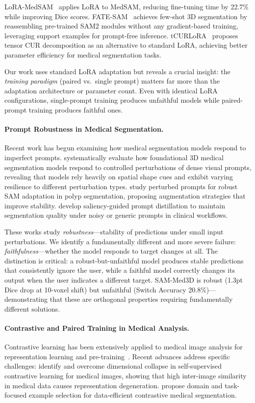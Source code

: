 LoRA-MedSAM~\citep{wu2024loramedsam} applies LoRA to MedSAM, reducing fine-tuning time by 22.7\% while improving Dice scores. FATE-SAM~\citep{deng2025fatesam} achieves few-shot 3D segmentation by reassembling pre-trained SAM2 modules without any gradient-based training, leveraging support examples for prompt-free inference. tCURLoRA~\citep{cheng2025tcurlora} proposes tensor CUR decomposition as an alternative to standard LoRA, achieving better parameter efficiency for medical segmentation tasks.

Our work uses standard LoRA adaptation but reveals a crucial insight: the \emph{training paradigm} (paired vs.\ single prompt) matters far more than the adaptation architecture or parameter count. Even with identical LoRA configurations, single-prompt training produces unfaithful models while paired-prompt training produces faithful ones.

\paragraph{Prompt Robustness in Medical Segmentation.}
Recent work has begun examining how medical segmentation models respond to imperfect prompts. \citet{chattopadhyay2026robustness} systematically evaluate how foundational 3D medical segmentation models respond to controlled perturbations of dense visual prompts, revealing that models rely heavily on spatial shape cues and exhibit varying resilience to different perturbation types. \citet{huang2024perturbed} study perturbed prompts for robust SAM adaptation in polyp segmentation, proposing augmentation strategies that improve stability. \citet{li2024saliency} develop saliency-guided prompt distillation to maintain segmentation quality under noisy or generic prompts in clinical workflows.

These works study \emph{robustness}---stability of predictions under small input perturbations. We identify a fundamentally different and more severe failure: \emph{faithfulness}---whether the model responds to target changes at all. The distinction is critical: a robust-but-unfaithful model produces stable predictions that consistently ignore the user, while a faithful model correctly changes its output when the user indicates a different target. SAM-Med3D is robust (1.3pt Dice drop at 10-voxel shift) but unfaithful (Switch Accuracy 20.8\%)---demonstrating that these are orthogonal properties requiring fundamentally different solutions.

\paragraph{Contrastive and Paired Training in Medical Analysis.}
Contrastive learning has been extensively applied to medical image analysis for representation learning and pre-training~\citep{zhao2024contrastive_survey}. Recent advances address specific challenges: \citet{liu2024collapse} identify and overcome dimensional collapse in self-supervised contrastive learning for medical images, showing that high inter-image similarity in medical data causes representation degeneration. \citet{wang2025domain_contrastive} propose domain and task-focused example selection for data-efficient contrastive medical segmentation.

